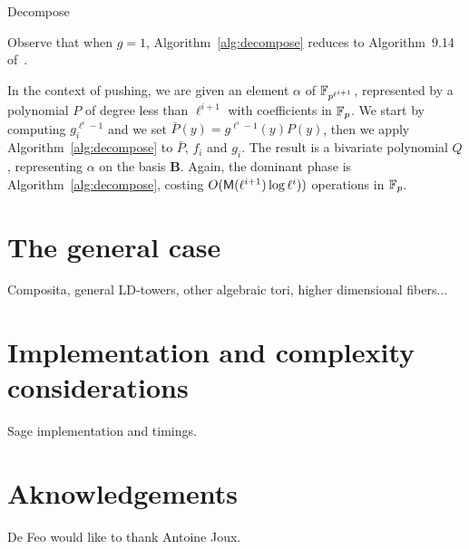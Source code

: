 \documentclass{sig-alternate}
\begin{document}
\begin{algorithm}[t]
  \caption{Decompose}
  \label{alg:decompose}
  \begin{algorithmic}
    \REQUIRE
    \ENSURE
  \end{algorithmic}
\end{algorithm}

Observe that when $g=1$, Algorithm~\ref{alg:decompose} reduces to
Algorithm~9.14 of~\cite{vzGG}.

In the context of pushing, we are given an element $\alpha$ of
$\mathbb{F}_{p^{\ell^{i+1}}}$, represented by a polynomial $P$ of degree less
than $\ell^{i+1}$ with coefficients in $\mathbb{F}_p$. We start by computing
$g_i^{\ell^i-1}$ and we set $\bar{P}(y) = g^{\ell^i-1}(y)P(y)$, then
we apply Algorithm~\ref{alg:decompose} to $\bar{P}$, $f_i$ and
$g_i$. The result is a bivariate polynomial $Q$, representing $\alpha$
on the basis $\mathbf{B}$. Again, the dominant phase is
Algorithm~\ref{alg:decompose}, costing
$O(\mathsf{M}(\ell^{i+1})\log\ell^i))$ operations in $\mathbb{F}_p$.


\section{The general case}
\label{sec:general}

Composita, general LD-towers, other algebraic tori, higher dimensional
fibers...


\section{Implementation and complexity considerations}
\label{sec:impl}

Sage implementation and timings.


\section{Aknowledgements}
De Feo would like to thank Antoine Joux.



\end{document}
